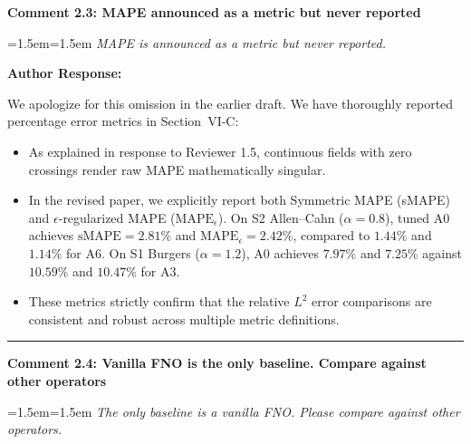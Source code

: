 \documentclass[11pt,a4paper]{article}
\newcommand{\revcomment}[2]{%
  \vspace{3mm}\par\noindent
  \textbf{\color{navyblue}#1}\par\vspace{1.5mm}
  \begingroup
  \leftskip=1.5em\rightskip=1.5em
  \small\itshape\color{commentgray}
  #2\par
  \endgroup
  \vspace{2mm}
}
\newenvironment{authorresponse}{%
  \vspace{1mm}\par\noindent
  \textbf{\color{navyblue}Author Response:}\par\vspace{1.5mm}
}{%
  \vspace{3mm}\par\noindent\rule{\textwidth}{0.3pt}\vspace{2mm}
}
\begin{document}
\revcomment{Comment 2.3: MAPE announced as a metric but never reported}{MAPE is announced as a metric but never reported.}

\begin{authorresponse}
We apologize for this omission in the earlier draft. We have thoroughly reported percentage error metrics in Section~VI-C:
\begin{itemize}
  \item As explained in response to Reviewer 1.5, continuous fields with zero crossings render raw MAPE mathematically singular.
  \item In the revised paper, we explicitly report both Symmetric MAPE (sMAPE) and $\epsilon$-regularized MAPE ($\text{MAPE}_\epsilon$). On S2 Allen--Cahn ($\alpha=0.8$), tuned A0 achieves $\text{sMAPE} = 2.81\%$ and $\text{MAPE}_\epsilon = 2.42\%$, compared to $1.44\%$ and $1.14\%$ for A6. On S1 Burgers ($\alpha=1.2$), A0 achieves $7.97\%$ and $7.25\%$ against $10.59\%$ and $10.47\%$ for A3.
  \item These metrics strictly confirm that the relative $L^2$ error comparisons are consistent and robust across multiple metric definitions.
\end{itemize}
\end{authorresponse}

\revcomment{Comment 2.4: Vanilla FNO is the only baseline. Compare against other operators}{The only baseline is a vanilla FNO. Please compare against other operators.}
\end{document}
